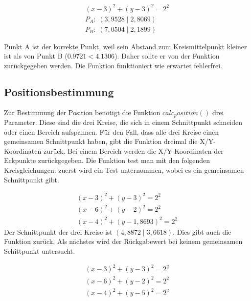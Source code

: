 \begin{equation*}
\label{eq:unit_test_abstand_zweier_punkte}
\begin{split}
(x - 3)^{2} + (y - 3)^{2} = 2^{2}\\
P_{A}: \; (3,9528 \;|\; 2,8069)\\
P_{B}: \; (7,0504 \;|\; 2,1899)
\end{split}
\end{equation*}

Punkt \si{A} ist der korrekte Punkt, weil sein Abstand zum Kreismittelpunkt kleiner ist als von Punkt \si{B} ($0.9721 < 4.1306$). Daher sollte er von der Funktion zurückgegeben werden. Die Funktion funktioniert wie erwartet fehlerfrei.

\subsection{Positionsbestimmung}
Zur Bestimmung der Position benötigt die Funktion $calc_position()$ drei Parameter. Diese sind die drei Kreise, die sich in einem Schnittpunkt schneiden oder einen Bereich aufspannen. Für den Fall, dass alle drei Kreise einen gemeinsamen Schnittpunkt haben, gibt die Funktion dreimal die X/Y-Koordinaten zurück. Bei einem Bereich werden die X/Y-Koordinaten der Eckpunkte zurückgegeben. Die Funktion test man mit den folgenden Kreisgleichungen: zuerst wird ein Test unternommen, wobei es ein gemeinsamen Schnittpunkt gibt.

\begin{equation*}
\label{eq:unit_test_positionsbestimmung}
\begin{split}
(x - 3)^{2} + (y - 3)^{2} = 2^{2} \\
(x - 6)^{2} + (y - 2)^{2} = 2^{2} \\
(x - 4)^{2} + (y - 1,8693)^{2} = 2^{2}
\end{split}
\end{equation*}
Der Schnittpunkt der drei Kreise ist $( 4,8872 \;|\; 3,6618)$. Dies gibt auch die Funktion zurück. Als nächstes wird der Rückgabewert bei keinem gemeinsamen Schittpunkt untersucht.

\begin{equation*}
\label{eq:unit_test_positionsbestimmung}
\begin{split}
(x - 3)^{2} + (y - 3)^{2} = 2^{2} \\
(x - 6)^{2} + (y - 2)^{2} = 2^{2} \\
(x - 4)^{2} + (y - 5)^{2} = 2^{2}
\end{split}
\end{equation*}

